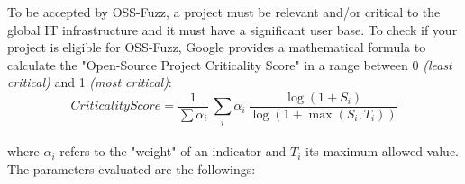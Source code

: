 \newpage
To be accepted by OSS-Fuzz, a project must be relevant and/or critical to the global IT infrastructure and it must have a significant user base.
\newline \newline
To check if your project is eligible for OSS-Fuzz, Google provides a mathematical formula to calculate the "Open-Source Project Criticality Score" \cite{score} in a range between 0 \textit{(least critical)} and 1 \textit{(most critical)}:
\ \\ \newline
\begin{equation}
    CriticalityScore = \frac{1}{\sum \alpha_i}\  \sum_i \alpha_i \ \frac{\log(1+S_i)}{\log(1+\max(S_i,T_i))}
\end{equation}
\ \\ \newline
where $\alpha_i$ refers to the "weight" of an indicator and $T_i$ its maximum allowed value.
\newline \newline \newline
The parameters evaluated are the followings:
